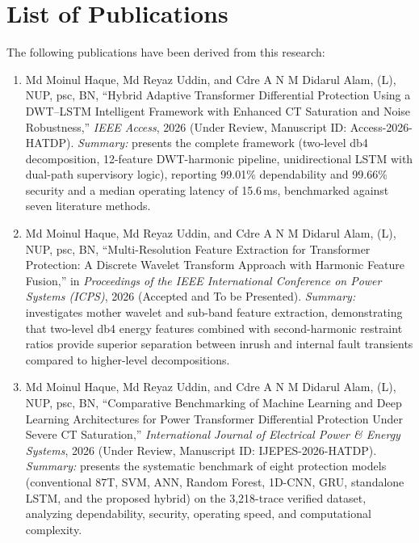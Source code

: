 \documentclass[12pt,a4paper,oneside]{report}
\begin{document}
\chapter*{List of Publications}
The following publications have been derived from this research:
\begin{enumerate}[leftmargin=1.6em,itemsep=6pt]
\item Md Moinul Haque, Md Reyaz Uddin, and Cdre A N M Didarul Alam, (L), NUP, psc, BN, ``Hybrid Adaptive Transformer Differential Protection Using a DWT--LSTM Intelligent Framework with Enhanced CT Saturation and Noise Robustness,'' \textit{IEEE Access}, 2026 (Under Review, Manuscript ID: Access-2026-HATDP). \textit{Summary:} presents the complete framework (two-level db4 decomposition, 12-feature DWT-harmonic pipeline, unidirectional LSTM with dual-path supervisory logic), reporting 99.01\% dependability and 99.66\% security and a median operating latency of 15.6\,ms, benchmarked against seven literature methods.
\item Md Moinul Haque, Md Reyaz Uddin, and Cdre A N M Didarul Alam, (L), NUP, psc, BN, ``Multi-Resolution Feature Extraction for Transformer Protection: A Discrete Wavelet Transform Approach with Harmonic Feature Fusion,'' in \textit{Proceedings of the IEEE International Conference on Power Systems (ICPS)}, 2026 (Accepted and To be Presented). \textit{Summary:} investigates mother wavelet and sub-band feature extraction, demonstrating that two-level db4 energy features combined with second-harmonic restraint ratios provide superior separation between inrush and internal fault transients compared to higher-level decompositions.
\item Md Moinul Haque, Md Reyaz Uddin, and Cdre A N M Didarul Alam, (L), NUP, psc, BN, ``Comparative Benchmarking of Machine Learning and Deep Learning Architectures for Power Transformer Differential Protection Under Severe CT Saturation,'' \textit{International Journal of Electrical Power \& Energy Systems}, 2026 (Under Review, Manuscript ID: IJEPES-2026-HATDP). \textit{Summary:} presents the systematic benchmark of eight protection models (conventional 87T, SVM, ANN, Random Forest, 1D-CNN, GRU, standalone LSTM, and the proposed hybrid) on the 3{,}218-trace verified dataset, analyzing dependability, security, operating speed, and computational complexity.
\end{enumerate}
\end{document}
